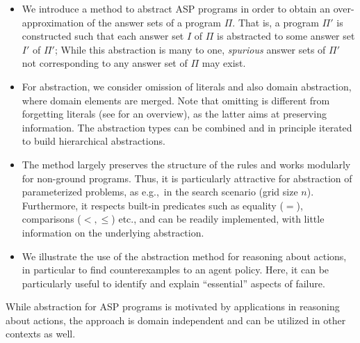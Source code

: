 \documentclass{new_tlp}
\newenvironment{myitemize}
{\begin{list}{$\bullet$}{%
\setlength{\topsep}{2pt} %
\setlength{\leftmargin}{0pt} %
\setlength{\itemsep}{0cm}
\setlength{\itemindent}{10pt}}} %
{\end{list}}
\begin{document}
\begin{itemize}
\item We introduce a method to abstract ASP programs in order to
  obtain an over-approximation of the answer sets of a program
  $\Pi$. That is, a program $\Pi'$ is constructed such that each answer
  set $I$ of $\Pi$ is abstracted to some answer set $I'$ of $\Pi'$; 
  While this abstraction is many to one, {\em spurious} answer sets of
  $\Pi'$ not corresponding to any answer set of $\Pi$ may exist. 

\item For abstraction, we consider omission of literals and also domain abstraction,
  where domain elements are merged. Note that omitting is different
  from forgetting literals (see \cite{DBLP:conf/lpnmr/Leite17} for an overview), as the latter aims at
  preserving information. %
  The abstraction types 
  can be combined and in principle iterated to build
  hierarchical abstractions.

\item The method largely preserves the structure of the rules and
  works modularly for non-ground programs. Thus, it is particularly attractive
  for abstraction of parameterized problems, as e.g.,\ in the search
  scenario (grid size $n$). Furthermore, it respects built-in
  predicates such as equality ($=$), comparisons ($<,\leq$) etc., and
  can be readily implemented, with little information on the underlying
  abstraction.
\item We illustrate the use of the abstraction method for reasoning about
   actions, in particular to find counterexamples to an 
   agent policy. Here, it can be particularly useful to
   identify  and explain ``essential'' aspects of failure.
\end{itemize}

While abstraction for ASP programs is motivated by applications in reasoning
about actions, the approach is domain independent and can be
utilized in other contexts as well.
\end{document}
